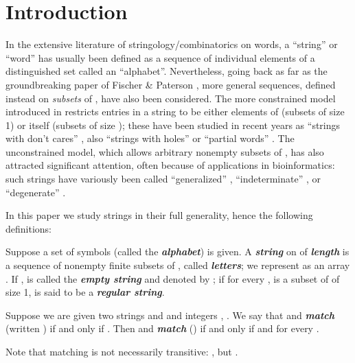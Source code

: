 \documentclass[runningheads,a4paper]{llncs}
\def\s#1{\mbox{\boldmath }}
\def\itbf#1{\textit{\textbf{#1}}}
\begin{document}
\section{Introduction}
\label{sect-intro}
In the extensive literature of stringology/combinatorics on words,
a ``string'' or ``word'' has usually been defined as a sequence
of individual elements of a distinguished set  called an ``alphabet''.
Nevertheless, going back as far as the groundbreaking paper of
Fischer \& Paterson \cite{FP74}, more general sequences,
defined instead on {\it subsets} of , have also been considered.
The more constrained model introduced in \cite{FP74} restricts
entries in a string to be either elements of 
(subsets of size 1) or  itself (subsets of size );
these have been studied in recent years as
``strings with don't cares'' \cite{IMMP03}, also
``strings with holes'' or ``partial words'' \cite{BS08}.
The unconstrained model, which allows arbitrary nonempty subsets of ,
has also attracted significant attention,
often because of applications in bioinformatics:
such strings have variously been called ``generalized'' \cite{A87},
``indeterminate'' \cite{HS03}, or ``degenerate'' \cite{IMR08}.

In this paper we study strings
in their full generality,
hence the following definitions:

\begin{definition}
\label{defn-string}
Suppose a set  of symbols (called the \itbf{alphabet}) is given.
A \itbf{string} \s{x} on  of \itbf{length}  is a sequence
of  nonempty finite subsets of , called \itbf{letters};
we represent \s{x} as an array .
If , \s{x} is called the \itbf{empty string}
and denoted by ;
if for every ,  is a subset of  of size 1,
\s{x} is said to be a \itbf{regular string}.
\end{definition}

\begin{definition}
\label{defn-match}
Suppose we are given two strings \s{x} and \s{y} and integers ,
. We say that  and  \itbf{match}
(written ) if and only if . Then \s{x} and \s{y} \itbf{match} ()
if and only if 
and  for every .
\end{definition}
Note that matching is not necessarily transitive:
, but .
\end{document}
